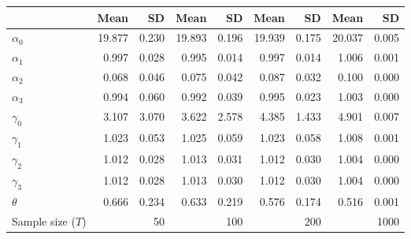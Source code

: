 
\begin{tabular}[t]{lrrrrrrrr}
\toprule
  & Mean & SD & Mean  & SD  & Mean   & SD   & Mean    & SD   \\
\midrule
$\alpha_{0}$ & 19.877 & 0.230 & 19.893 & 0.196 & 19.939 & 0.175 & 20.037 & 0.005\\
$\alpha_{1}$ & 0.997 & 0.028 & 0.995 & 0.014 & 0.997 & 0.014 & 1.006 & 0.001\\
$\alpha_{2}$ & 0.068 & 0.046 & 0.075 & 0.042 & 0.087 & 0.032 & 0.100 & 0.000\\
$\alpha_{3}$ & 0.994 & 0.060 & 0.992 & 0.039 & 0.995 & 0.023 & 1.003 & 0.000\\
$\gamma_{0}$ & 3.107 & 3.070 & 3.622 & 2.578 & 4.385 & 1.433 & 4.901 & 0.007\\
$\gamma_{1}$ & 1.023 & 0.053 & 1.025 & 0.059 & 1.023 & 0.058 & 1.008 & 0.001\\
$\gamma_{2}$ & 1.012 & 0.028 & 1.013 & 0.031 & 1.012 & 0.030 & 1.004 & 0.000\\
$\gamma_{3}$ & 1.012 & 0.028 & 1.013 & 0.030 & 1.012 & 0.030 & 1.004 & 0.000\\
$\theta$ & 0.666 & 0.234 & 0.633 & 0.219 & 0.576 & 0.174 & 0.516 & 0.001\\
Sample size ($T$) &  & 50 &  & 100 &  & 200 &  & 1000\\
\bottomrule
\end{tabular}
